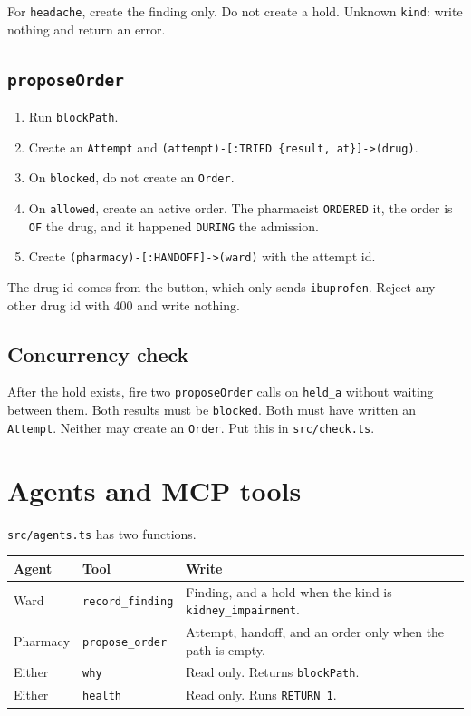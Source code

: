 \documentclass[11pt,a4paper]{article}
\newcommand{\code}[1]{\texttt{#1}}
\newcommand{\file}[1]{\texttt{#1}}
\begin{document}
For \code{headache}, create the finding only. Do not create a hold.
Unknown \code{kind}: write nothing and return an error.

\subsection{\code{proposeOrder}}

\begin{enumerate}
  \item Run \code{blockPath}.
  \item Create an \code{Attempt} and \code{(attempt)-[:TRIED \{result, at\}]->(drug)}.
  \item On \code{blocked}, do not create an \code{Order}.
  \item On \code{allowed}, create an active order. The pharmacist \code{ORDERED} it, the order is \code{OF} the drug, and it happened \code{DURING} the admission.
  \item Create \code{(pharmacy)-[:HANDOFF]->(ward)} with the attempt id.
\end{enumerate}

The drug id comes from the button, which only sends \code{ibuprofen}. Reject any other drug id with 400 and write nothing.

\subsection{Concurrency check}

After the hold exists, fire two \code{proposeOrder} calls on \code{held\_a} without waiting between them.
Both results must be \code{blocked}. Both must have written an \code{Attempt}.
Neither may create an \code{Order}. Put this in \file{src/check.ts}.

\section{Agents and MCP tools}

\file{src/agents.ts} has two functions.

\begin{center}
\begin{tabularx}{\textwidth}{@{}lXX@{}}
\toprule
\textbf{Agent} & \textbf{Tool} & \textbf{Write} \\
\midrule
Ward & \code{record\_finding} & Finding, and a hold when the kind is \code{kidney\_impairment}. \\
Pharmacy & \code{propose\_order} & Attempt, handoff, and an order only when the path is empty. \\
Either & \code{why} & Read only. Returns \code{blockPath}. \\
Either & \code{health} & Read only. Runs \code{RETURN 1}. \\
\bottomrule
\end{tabularx}
\end{center}
\end{document}

